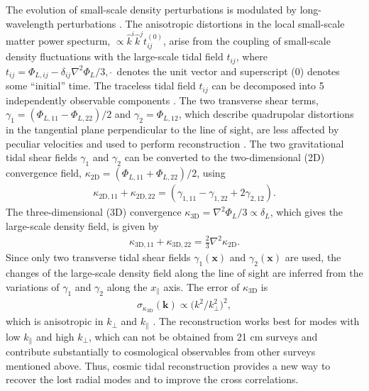 \documentclass[aps,prl,twocolumn,showpacs,superscriptaddress,groupedaddress,nofootinbib,floatfix]{revtex4}  %
\newcommand{\mr}{\mathrm}
\begin{document}
The evolution of small-scale density perturbations is modulated by 
long-wavelength perturbations \cite{2014:tidal}. 
The anisotropic distortions in the local small-scale matter power specturm,
$\propto\hat{k}^i\hat{k}^jt_{ij}^{(0)}$, arise from the coupling of small-scale
density fluctuations with the large-scale tidal field $t_{ij}$, where 
$t_{ij}=\Phi_{L,ij}-\delta_{ij}\nabla^2\Phi_L/3$, $\hat{\ }$ denotes the 
unit vector and superscript (0) denotes some ``initial'' time. 
The traceless tidal field $t_{ij}$ can be decomposed into 5 independently 
observable components \cite{2015:zhu}.
The two transverse shear terms, 
$\gamma_1=(\Phi_{L,11}-\Phi_{L,22})/2$ and $\gamma_2=\Phi_{L,12}$,
which describe quadrupolar distortions in the tangential plane perpendicular
to the line of sight, are less affected by peculiar velocities and used to 
perform reconstruction \cite{2015:zhu}.
The two gravitational tidal shear fields $\gamma_1$ and $\gamma_2$
can be converted to the two-dimensional (2D) convergence field, 
$\kappa_\mr{2D}=(\Phi_{L,11}+\Phi_{L,22})/2$, using
\begin{eqnarray}
\label{eq:kappa2d}
\kappa_{\mr{2D},11}+\kappa_{\mr{2D},22}=
(\gamma_{1,11}-\gamma_{1,22}+2\gamma_{2,12}).
\end{eqnarray}
The three-dimensional (3D) convergence $\kappa_\mr{3D}=\nabla^2\Phi_L/3\propto\delta_L$, which gives
the large-scale density field, is given by 
\begin{eqnarray}
\label{eq:kappa3d}
\kappa_{\mr{3D},11}+\kappa_{\mr{3D},22}=\frac{2}{3}\nabla^2\kappa_\mr{2D}.
\end{eqnarray}
Since only two transverse tidal shear fields $\gamma_1(\bm{x})$ and 
$\gamma_2(\bm{x})$ are used, the changes of the large-scale density field along
the line of sight are inferred from the variations of $\gamma_1$ and $\gamma_2$
along the $x_\parallel$ axis. The error of $\kappa_\mr{3D}$ is 
\begin{eqnarray}
\sigma_{\kappa_\mr{3D}}(\bm{k})\propto\big({k^2}/{k_\perp^2}\big)^2,
\end{eqnarray}
which is anisotropic in $k_\perp$ and $k_\parallel$ \cite{2015:zhu}.
The reconstruction works best for modes with low $k_\parallel$ and high 
$k_\perp$, which can not be obtained from 21 cm surveys and contribute 
substantially to cosmological observables from other surveys mentioned above.
Thus, cosmic tidal reconstruction provides a new way to recover the lost 
radial modes and to improve the cross correlations.
\end{document}
